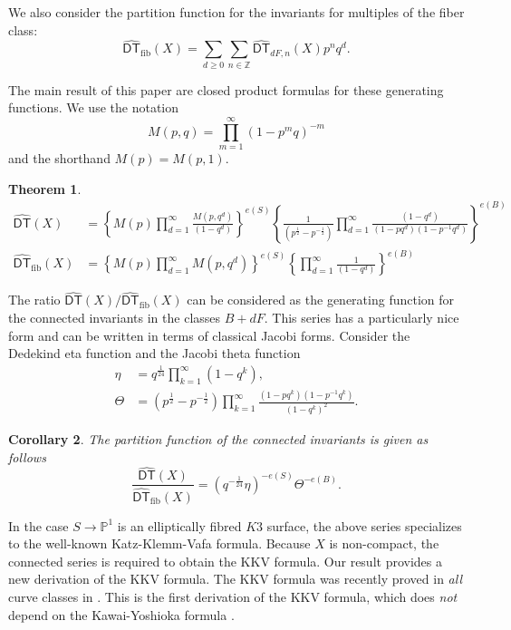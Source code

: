 \documentclass{amsart}
\newtheorem{theorem}{Theorem}%
\newtheorem{corollary}[theorem]{Corollary}
\theoremstyle{definition}
\newcommand{\ZZ} {\mathbb{Z}}		%
\newcommand{\PP} {\mathbb{P}}
\newcommand{\DT}{\mathsf{DT}}
\newcommand{\DThat}{\widehat{\DT}}
\newcommand{\fiber}{\mathrm{fib}}
\newcommand{\half}{\frac{1}{2}}
\begin{document}
We also consider the partition function for the invariants for
multiples of the fiber class:
\[
\DThat_{\fiber}(X) = \sum_{d\geq 0} \sum_{n \in \ZZ} \DThat_{dF,n}(X)
p^{n} q^{d} .
\]


The main result of this paper are closed product formulas for these generating
functions. We use the notation
\[
M(p,q) = \prod_{m=1}^{\infty} (1-p^{m}q)^{-m}
\]
and the shorthand $M(p)=M(p,1)$.

\begin{theorem}\label{thm: main thm -- formulas for DT and DTfiber}
\begin{align*}
\DThat (X) &= \left \{M(p)\prod_{d=1}^{\infty}
\frac{M(p,q^{d})}{(1-q^{d})} \right\}^{e(S)}
\left\{\frac{1}{(p^{\half}-p^{-\half})}\prod_{d=1}^{\infty}\frac{(1-q^{d})}{(1-pq^{d})(1-p^{-1}q^{d})}
\right\}^{e(B)} \\
\DThat_{\fiber}(X) &= \left\{M(p)\prod_{d=1}^{\infty}M(p,q^{d})
\right\}^{e(S)} \left\{\prod_{d=1}^{\infty}\frac{1}{(1-q^{d})}
\right\}^{e(B)}
\end{align*}
\end{theorem}


The ratio $\DThat (X)/\DThat_{\fiber}(X)$ can be considered as the
generating function for the connected invariants in the classes
$B+dF$. This series has a particularly nice form and can be written in
terms of classical Jacobi forms.  Consider the Dedekind eta function
and the Jacobi theta function
\begin{align*}
\eta &= q^{\frac{1}{24}} \prod_{k=1}^{\infty}(1-q^k), \\
\Theta &= 
(p^{\frac{1}{2}} - p^{-\frac{1}{2}}) \prod_{k=1}^{\infty} \frac{(1-p q^k) (1-p^{-1} q^k)}{(1-q^k)^2}.
\end{align*}

\begin{corollary} The partition function of the connected invariants is given as follows
\[
\frac{\DThat (X)}{\DThat_{\fiber}(X)}=
\left(q^{-\frac{1}{24}}\eta  \right)^{-e(S)}\Theta^{-e(B)}.
\]
\end{corollary}

In the case $S \rightarrow \PP^1$ is an elliptically fibred $K3$
surface, the above series specializes to the well-known
Katz-Klemm-Vafa formula. Because $X$ is non-compact, the connected
series is required to obtain the KKV formula. Our result provides a
new derivation of the KKV formula. The KKV formula was recently proved
in \emph{all} curve classes in \cite{PT}. This is the first derivation
of the KKV formula, which does \emph{not} depend on the Kawai-Yoshioka
formula \cite{KY}.
\end{document}
